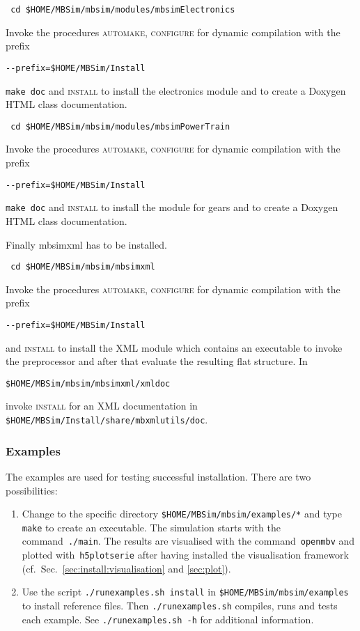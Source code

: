 \begin{verbatim}
 cd $HOME/MBSim/mbsim/modules/mbsimElectronics
\end{verbatim}
Invoke the procedures \textsc{automake, configure} for dynamic compilation with the prefix
\begin{verbatim}
--prefix=$HOME/MBSim/Install
\end{verbatim}
\texttt{make doc} and \textsc{install} to install the electronics module and to create a Doxygen HTML class documentation.\vspace{5mm}
\begin{verbatim}
 cd $HOME/MBSim/mbsim/modules/mbsimPowerTrain
\end{verbatim}
Invoke the procedures \textsc{automake, configure} for dynamic compilation with the prefix
\begin{verbatim}
--prefix=$HOME/MBSim/Install
\end{verbatim}
\texttt{make doc} and \textsc{install} to install the module for gears and to create a Doxygen HTML class documentation.\vspace{5mm} 

Finally mbsimxml has to be installed.
\begin{verbatim}
 cd $HOME/MBSim/mbsim/mbsimxml
\end{verbatim}
Invoke the procedures \textsc{automake, configure} for dynamic compilation with the prefix
\begin{verbatim}
--prefix=$HOME/MBSim/Install
\end{verbatim}
and \textsc{install} to install the XML module which contains an executable to invoke the preprocessor and after that evaluate the resulting flat structure. In
\begin{verbatim}
$HOME/MBSim/mbsim/mbsimxml/xmldoc
\end{verbatim}
invoke \textsc{install} for an XML documentation in \texttt{\$HOME/MBSim/Install/share/mbxmlutils/doc}.

\subsubsection{\MBSim Examples}
The examples are used for testing successful installation. There are two possibilities:
\begin{enumerate}
\item Change to the specific directory \texttt{\$HOME/MBSim/mbsim/examples/*} and type \texttt{make} to create an executable. The simulation starts with the command~\texttt{./main}. The results are visualised with the command~\texttt{openmbv} and plotted with~\texttt{h5plotserie} after having installed the visualisation framework (cf.~Sec.~\ref{sec:install:visualisation} and \ref{sec:plot}).
\item Use the script \texttt{./runexamples.sh install} in \texttt{\$HOME/MBSim/mbsim/examples} to install reference files. Then \texttt{./runexamples.sh} compiles, runs and tests each example. See \texttt{./runexamples.sh -h} for additional information.
\end{enumerate}

